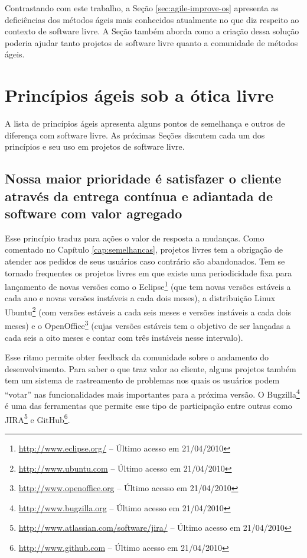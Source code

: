 Contrastando com este trabalho, a Seção \ref{sec:agile-improve-os}
apresenta as deficiências dos métodos ágeis mais conhecidos atualmente
no que diz respeito ao contexto de software livre. A Seção também
aborda como a criação dessa solução poderia ajudar tanto projetos de
software livre quanto a comunidade de métodos ágeis.

\section{Princípios ágeis sob a ótica livre}
\label{sec:principles}

A lista de princípios ágeis apresenta alguns pontos de semelhança e
outros de diferença com software livre. As próximas Seções discutem
cada um dos princípios e seu uso em projetos de software livre.

\subsection{Nossa maior prioridade é satisfazer o cliente através da
      entrega contínua e adiantada de software com valor agregado}

Esse princípio traduz para ações o valor de resposta a mudanças. Como
comentado no Capítulo \ref{cap:semelhancas}, projetos livres tem a
obrigação de atender aos pedidos de seus usuários caso contrário são
abandonados. Tem se tornado frequentes os projetos livres em que
existe uma periodicidade fixa para lançamento de novas versões como o
Eclipse\footnote{\url{http://www.eclipse.org/} -- Último acesso em
  21/04/2010} (que tem novas versões estáveis a cada ano e novas
versões instáveis a cada dois meses), a distribuição Linux
Ubuntu\footnote{\url{http://www.ubuntu.com} -- Último acesso em
  21/04/2010} (com versões estáveis a cada seis meses e versões
instáveis a cada dois meses) e o
OpenOffice\footnote{\url{http://www.openoffice.org} -- Último acesso
  em 21/04/2010} (cujas versões estáveis tem o objetivo de ser
lançadas a cada seis a oito meses e contar com três instáveis nesse
intervalo).

Esse ritmo permite obter feedback da comunidade sobre o andamento do
desenvolvimento. Para saber o que traz valor ao cliente, alguns
projetos também tem um sistema de rastreamento de problemas nos quais
os usuários podem ``votar'' nas funcionalidades mais importantes para
a próxima versão. O Bugzilla\footnote{\url{http://www.bugzilla.org} --
  Último acesso em 21/04/2010} é uma das ferramentas que permite esse
tipo de participação entre outras como
JIRA\footnote{\url{http://www.atlassian.com/software/jira/} -- Último
  acesso em 21/04/2010} e GitHub\footnote{\url{http://www.github.com}
  -- Último acesso em 21/04/2010}.

